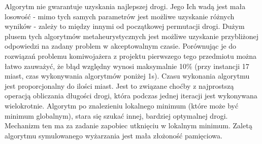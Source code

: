\documentclass{article}
\begin{document}
Algorytm nie gwarantuje uzyskania najlepszej drogi. Jego Ich wadą jest mała losowość - mimo tych samych parametrów jest możliwe uzyskanie różnych wyników - zależy to między innymi od początkowej permutacji drogi. Dużym plusem tych algorytmów metaheurystycznych jest możliwe uzyskanie przybliżonej odpowiedzi na zadany problem w akceptowalnym czasie. Porównując je do rozwiązań problemu komiwojażera z projektu pierwszego tego przedmiotu można łatwo zauważyć, że błąd względny wynosi maksymalnie 10\% (przy instancji 17 miast, czas wykonywania algorytmów poniżej 1s).
Czasu wykonania algorytmu jest proporcjonalny do ilości miast. Jest to związane choćby z najprostszą operacją obliczania długości drogi, która podczas jednej iteracji jest wykonywana wielokrotnie.
Algorytm po znalezieniu lokalnego minimum (które może być minimum globalnym), stara się szukać innej, bardziej optymalnej drogi. Mechanizm ten ma za zadanie zapobiec utknięciu w lokalnym minimum.
Zaletą algorytmu symulowanego wyżarzania jest mała złożoność pamięciowa.
\end{document}
